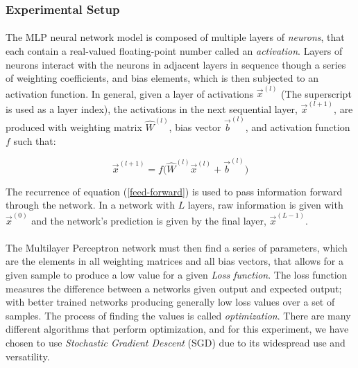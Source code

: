 \documentclass[12pt,letterpaper]{article}
\begin{document}
\paragraph*{}


\subsubsection{Experimental Setup}

\paragraph*{}The MLP neural network model is composed of multiple layers of \textit{neurons}, that each contain a real-valued floating-point number called an \textit{activation}. Layers of neurons interact with the neurons in adjacent layers in sequence though a series of weighting coefficients, and bias elements, which is then subjected to an activation function. In general, given a layer of activations $\vec{x}^{(l)}$ (The superscript is used as a layer index), the activations in the next sequential layer, $\vec{x}^{(l+1)}$, are produced with weighting matrix $\hat{W}^{(l)}$, bias vector $\vec{b}^{(l)}$, and activation function $f$ such that:

\begin{equation}
\label{feed-forward}
\vec{x}^{(l+1)} = f \Big( \hat{W}^{(l)} \vec{x}^{(l)} + \vec{b}^{(l)} \Big)
\end{equation}

The recurrence of equation (\ref{feed-forward}) is used to pass information forward through the network. In a network with $L$ layers, raw information is given with $\vec{x}^{(0)}$ and the network's prediction is given by the final layer, $\vec{x}^{(L-1)}$.

\paragraph*{}The Multilayer Perceptron network must then find a series of parameters, which are the elements in all weighting matrices and all bias vectors, that allows for a given sample to produce a low value for a given \textit{Loss function}. The loss function measures the difference between a networks given output and expected output; with better trained networks producing generally low loss values over a set of samples. The process of finding the values is called \textit{optimization}. There are many different algorithms that perform optimization, and for this experiment, we have chosen to use \textit{Stochastic Gradient Descent} (SGD) due to its widespread use and versatility.
\end{document}
